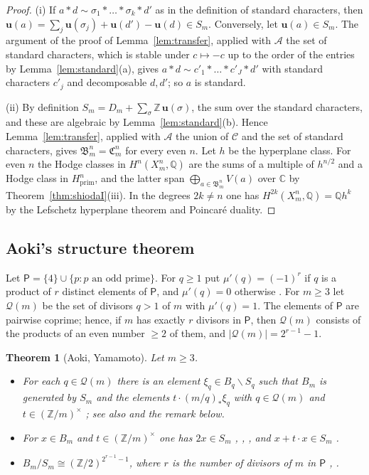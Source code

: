 \documentclass[11pt]{amsart}
\newtheorem{theorem}{Theorem}[section]
\theoremstyle{definition}
\theoremstyle{remark}
\numberwithin{equation}{section}
\newcommand{\Q}{\mathbb{Q}}
\newcommand{\C}{\mathbb{C}}
\newcommand{\Z}{\mathbb{Z}}
\newcommand{\fB}{\mathfrak{B}}
\newcommand{\fC}{\mathfrak{C}}
\newcommand{\cQ}{\mathcal{Q}}
\newcommand{\sP}{\mathsf{P}}
\newcommand{\uu}{\mathbf{u}}
\newcommand{\sm}{\smallsetminus}
\begin{document}
\begin{proof}
(i) If $a*d\sim\sigma_1*\dots*\sigma_k*d'$ as in the definition of standard characters, then $\uu(a)=\sum_j\uu(\sigma_j)+\uu(d')-\uu(d)\in S_m$. Conversely, let $\uu(a)\in S_m$. The argument of the proof of Lemma~\ref{lem:transfer}, applied with $\mathcal A$ the set of standard characters, which is stable under $c\mapsto -c$ up to the order of the entries by Lemma~\ref{lem:standard}(a), gives $a*d\sim c'_1*\dots*c'_J*d'$ with standard characters $c'_j$ and decomposable $d,d'$; so $a$ is standard.

(ii) By definition $S_m=D_m+\sum_\sigma\Z\,\uu(\sigma)$, the sum over the standard characters, and these are algebraic by Lemma~\ref{lem:standard}(b). Hence Lemma~\ref{lem:transfer}, applied with $\mathcal A$ the union of $\mathcal C$ and the set of standard characters, gives $\fB^n_m=\fC^n_m$ for every even $n$. Let $h$ be the hyperplane class. For even $n$ the Hodge classes in $H^n(X^n_m,\Q)$ are the sums of a multiple of $h^{n/2}$ and a Hodge class in $H^n_{\mathrm{prim}}$, and the latter span $\bigoplus_{a\in\fB^n_m}V(a)$ over $\C$ by Theorem~\ref{thm:shiodaI}(iii). In the degrees $2k\ne n$ one has $H^{2k}(X^n_m,\Q)=\Q h^k$ by the Lefschetz hyperplane theorem and Poincar\'e duality.
\end{proof}

\subsection{Aoki's structure theorem}\label{subsec:aokiD}
Let $\sP=\{4\}\cup\{p:p\text{ an odd prime}\}$. For $q\ge1$ put $\mu'(q)=(-1)^r$ if $q$ is a product of $r$ distinct elements of $\sP$, and $\mu'(q)=0$ otherwise \cite[Section~2]{Ao00}. For $m\ge3$ let $\cQ(m)$ be the set of divisors $q>1$ of $m$ with $\mu'(q)=1$. The elements of $\sP$ are pairwise coprime; hence, if $m$ has exactly $r$ divisors in $\sP$, then $\cQ(m)$ consists of the products of an even number $\ge2$ of them, and $|\cQ(m)|=2^{r-1}-1$.

\begin{theorem}[Aoki, Yamamoto]\label{thm:aokiD}
Let $m\ge3$.
\begin{itemize}
\item[(i)] For each $q\in\cQ(m)$ there is an element $\xi_q\in B_q\sm S_q$ such that $B_m$ is generated by $S_m$ and the elements $t\cdot(m/q)_*\xi_q$ with $q\in\cQ(m)$ and $t\in(\Z/m)^\times$ \cite[Thm.~2.1]{Ao00}; see also \cite[Thm.~D]{Ao83} and the remark below.
\item[(ii)] For $x\in B_m$ and $t\in(\Z/m)^\times$ one has $2x\in S_m$ \cite[Thm.~2.1]{Ao00}, \cite{Ku79}, \cite[Rem.~5.4]{Ao83}, and $x+t\cdot x\in S_m$ \cite[proof of Cor.~2.3]{Ao00}.
\item[(iii)] $B_m/S_m\cong(\Z/2)^{2^{r-1}-1}$, where $r$ is the number of divisors of $m$ in $\sP$ \cite[Thm.~4]{Ya75}, \cite[Rem.~2.4]{Ao00}.
\end{itemize}
\end{theorem}
\end{document}
